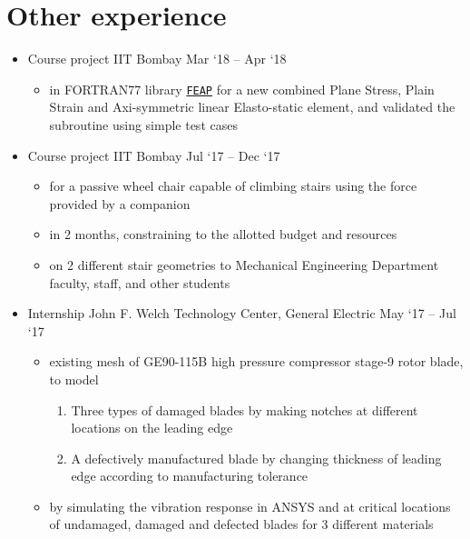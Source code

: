 \documentclass[a4paper,10pt]{article}
\newcommand{\feap}{\href{https://www.cs.cornell.edu/~bindel//blurbs/feap.html}{\texttt{FEAP}}}
\begin{document}
\section{Other experience}
\begin{itemize}
	\item {}
	{Course project}
	{IIT Bombay}
	{Mar `18 -- Apr `18}
	\begin{itemize}
		\item {} in FORTRAN77 library \feap{} for a new combined Plane Stress, Plain Strain and Axi-symmetric linear Elasto-static element, and validated the subroutine using simple test cases
	\end{itemize}
	\item {}
	{Course project}
	{IIT Bombay}
	{Jul `17 -- Dec `17}
	\begin{itemize}
		\item {} for a passive wheel chair capable of climbing stairs using the force provided by a companion
		\item {} in 2 months, constraining to the allotted budget and resources
		\item {} on 2 different stair geometries to Mechanical Engineering Department faculty, staff, and other students
	\end{itemize}
	\item {}
	{Internship}
	{John F. Welch Technology Center, General Electric}
	{May `17 -- Jul `17}
	\begin{itemize}
		\item {} existing mesh of GE90-115B high pressure compressor stage-9 rotor blade, to model
		\begin{enumerate}
			\item Three types of damaged blades by making notches at different locations on the leading edge
			\item A defectively manufactured blade by changing thickness of leading edge according to manufacturing tolerance
		\end{enumerate}
		\item {} by simulating the vibration response in ANSYS and  at critical locations of undamaged, damaged and defected blades for 3 different materials
	\end{itemize}
\end{itemize}
\end{document}
